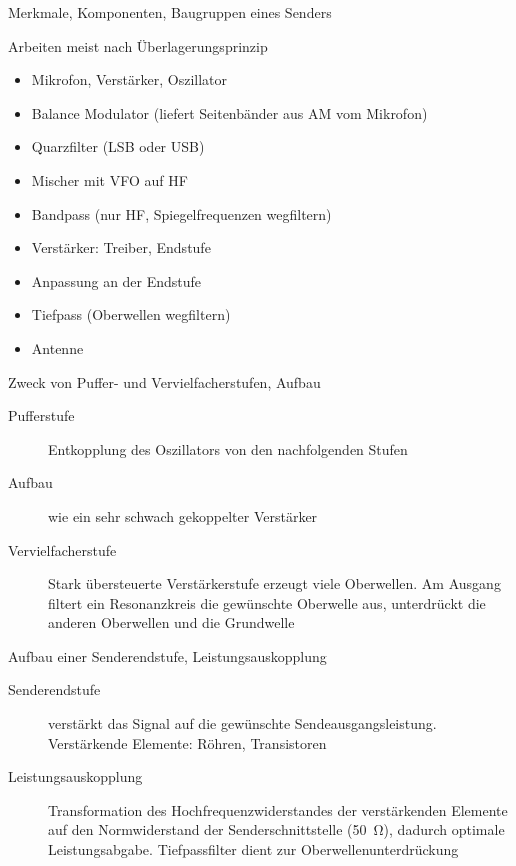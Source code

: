 \documentclass[avery5371,grid,frame,a4paper]{flashcards}
\newcommand{\card}[3]{
  \begin{flashcard}[{\chap} -- #1]{#2}#3\end{flashcard}
}
\begin{document}
\card{57}{Merkmale, Komponenten, Baugruppen eines Senders}{
  \small
  \begin{description}\itemsep0pt
    \item[Merkmale]
      Arbeiten meist nach Überlagerungsprinzip
    \item[Komponenten, Baugruppen]
  \end{description}
  \scriptsize
  \begin{itemize}\itemsep0pt
    \item Mikrofon, Verstärker, Oszillator
    \item Balance Modulator (liefert Seitenbänder aus AM vom Mikrofon)
    \item Quarzfilter (LSB oder USB)
    \item Mischer mit VFO auf HF
    \item Bandpass (nur HF, Spiegelfrequenzen wegfiltern)
    \item Verstärker: Treiber, Endstufe
    \item Anpassung an der Endstufe
    \item Tiefpass (Oberwellen wegfiltern)
    \item Antenne
  \end{itemize}
}
\card{58}{Zweck von Puffer- und Vervielfacherstufen, Aufbau}{
  \begin{description}
    \item[Pufferstufe] Entkopplung des Oszillators von den nachfolgenden Stufen
    \item[Aufbau] wie ein sehr schwach gekoppelter Verstärker
    \item[Vervielfacherstufe]
      Stark übersteuerte Verstärkerstufe erzeugt viele Oberwellen.
      Am Ausgang filtert ein Resonanzkreis die gewünschte Oberwelle aus,
      unterdrückt die anderen Oberwellen und die Grundwelle
  \end{description}
}
\card{59}{Aufbau einer Senderendstufe, Leistungsauskopplung}{
  \begin{description}
    \item[Senderendstufe]
      verstärkt das Signal auf die gewünschte Sendeausgangsleistung.
      Verstärkende Elemente: Röhren, Transistoren
    \item[Leistungsauskopplung]
      Transformation des Hochfrequenzwiderstandes der verstärkenden Elemente auf den Normwiderstand der Senderschnittstelle (\SI{50}{\ohm}), dadurch optimale Leistungsabgabe.
      Tiefpassfilter dient zur Oberwellenunterdrückung
  \end{description}
}
\end{document}
